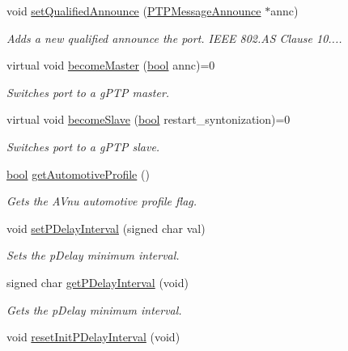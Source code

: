 \begin{DoxyCompactItemize}
void \hyperlink{class_common_port_a6d8b30d648cbd6048a083e64bf3cd0dd}{set\+Qualified\+Announce} (\hyperlink{class_p_t_p_message_announce}{P\+T\+P\+Message\+Announce} $\ast$annc)
\begin{DoxyCompactList}\small\item\em Adds a new qualified announce the port. I\+E\+EE 802.\+AS Clause 10.... \end{DoxyCompactList}\item 
virtual void \hyperlink{class_common_port_a03b0297c9770e83706826350b2815bc1}{become\+Master} (\hyperlink{avb__gptp_8h_af6a258d8f3ee5206d682d799316314b1}{bool} annc)=0
\begin{DoxyCompactList}\small\item\em Switches port to a g\+P\+TP master. \end{DoxyCompactList}\item 
virtual void \hyperlink{class_common_port_aea8c32e0a9e71cdc96183437572fb153}{become\+Slave} (\hyperlink{avb__gptp_8h_af6a258d8f3ee5206d682d799316314b1}{bool} restart\+\_\+syntonization)=0
\begin{DoxyCompactList}\small\item\em Switches port to a g\+P\+TP slave. \end{DoxyCompactList}\item 
\hyperlink{avb__gptp_8h_af6a258d8f3ee5206d682d799316314b1}{bool} \hyperlink{class_common_port_ad8dc4b5a985b466538d6805970eb0176}{get\+Automotive\+Profile} ()
\begin{DoxyCompactList}\small\item\em Gets the A\+Vnu automotive profile flag. \end{DoxyCompactList}\item 
void \hyperlink{class_common_port_aeccea93c15d4e8ce00dd87a20227a8bb}{set\+P\+Delay\+Interval} (signed char val)
\begin{DoxyCompactList}\small\item\em Sets the p\+Delay minimum interval. \end{DoxyCompactList}\item 
signed char \hyperlink{class_common_port_a6b594b958b0887ec332bfb61bc5981c4}{get\+P\+Delay\+Interval} (void)
\begin{DoxyCompactList}\small\item\em Gets the p\+Delay minimum interval. \end{DoxyCompactList}\item 
void \hyperlink{class_common_port_a581ecd601f511bc0e7378f12ff690c63}{reset\+Init\+P\+Delay\+Interval} (void)

\end{DoxyCompactItemize}
